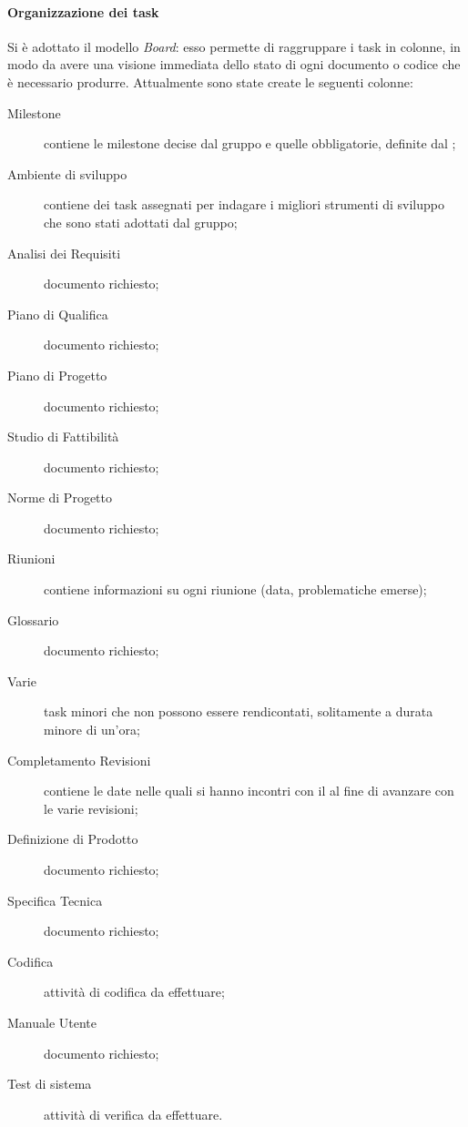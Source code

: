 		\paragraph{Organizzazione dei task} 
			Si è adottato il modello \emph{Board}: esso permette di raggruppare i task in colonne, in modo da avere una visione immediata dello stato di ogni documento o codice che è necessario produrre.
			Attualmente sono state create le seguenti colonne:
			\begin{description}
				\item[Milestone] contiene le milestone decise dal gruppo e quelle obbligatorie, definite dal \TV;
				\item[Ambiente di sviluppo] contiene dei task assegnati per indagare i migliori strumenti di sviluppo che sono stati adottati dal gruppo;
				\item[Analisi dei Requisiti] documento richiesto;
				\item[Piano di Qualifica] documento richiesto;
				\item[Piano di Progetto] documento richiesto;
				\item[Studio di Fattibilità] documento richiesto;
				\item[Norme di Progetto] documento richiesto;
				\item[Riunioni] contiene informazioni su ogni riunione (data, problematiche emerse);
				\item[Glossario] documento richiesto;
				\item[Varie] task minori che non possono essere rendicontati, solitamente a durata minore di un'ora;
				\item[Completamento Revisioni] contiene le date nelle quali si hanno incontri con il \TV al fine di avanzare con le varie revisioni; 
				\item[Definizione di Prodotto] documento richiesto;
				\item[Specifica Tecnica] documento richiesto;
				\item[Codifica] attività di codifica da effettuare;
				\item[Manuale Utente] documento richiesto;
				\item[Test di sistema] attività di verifica da effettuare.
			\end{description}
